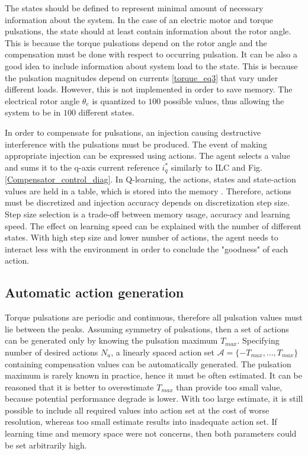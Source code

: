 The states should be defined to represent minimal amount of necessary information about the system. In the case of an electric motor and torque pulsations, the state should at least contain information about the rotor angle. This is because the torque pulsations depend on the rotor angle and the compensation must be done with respect to occurring pulsation. It can be also a good idea to include information about system load to the state. This is because the pulsation magnitudes depend on currents \eqref{torque_eq3} that vary under different loads. However, this is not implemented in order to save memory. The electrical rotor angle $\theta_e$ is quantized to $100$ possible values, thus allowing the system to be in $100$ different states.

In order to compensate for pulsations, an injection causing destructive interference with the pulsations must be produced. The event of making appropriate injection can be expressed using actions. The agent selects a value and sums it to the q-axis current reference $i_q^*$ similarly to ILC and Fig. \ref{Compensator_control_diag}. In Q-learning, the actions, states and state-action values are held in a table, which is stored into the memory \cite{RL:Sutton-Barto}. Therefore, actions must be discretized and injection accuracy depends on discretization step size. Step size selection is a trade-off between memory usage, accuracy and learning speed. The effect on learning speed can be explained with the number of different states. With high step size and lower number of actions, the agent needs to interact less with the environment in order to conclude the "goodness" of each action.

\subsection{Automatic action generation}
Torque pulsations are periodic and continuous, therefore all pulsation values must lie between the peaks. Assuming symmetry of pulsations, then a set of actions can be generated only by knowing the pulsation maximum $T_{max}$. Specifying number of desired actions $N_a$, a linearly spaced action set $\mathcal{A} = \{-T_{max}, ..., T_{max}\}$ containing compensation values can be automatically generated. The pulsation maximum is rarely known in practice, hence it must be often estimated. It can be reasoned that it is better to overestimate $T_{max}$ than provide too small value, because potential performance degrade is lower. With too large estimate, it is still possible to include all required values into action set at the cost of worse resolution, whereas too small estimate results into inadequate action set. If learning time and memory space were not concerns, then both parameters could be set arbitrarily high.

